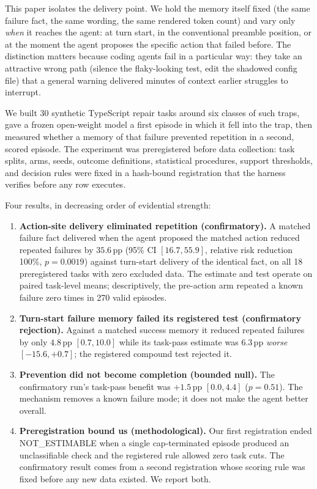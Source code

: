 \documentclass[11pt]{article}
\newcommand{\pp}{\ensuremath{\,\mathrm{pp}}}
\begin{document}
This paper isolates the delivery point. We hold the memory itself fixed (the
same failure fact, the same wording, the same rendered token count) and vary
only \emph{when} it reaches the agent: at turn start, in the conventional
preamble position, or at the moment the agent proposes the specific action
that failed before. The distinction matters because coding agents fail in a
particular way: they take an attractive wrong path (silence the flaky-looking
test, edit the shadowed config file) that a general warning delivered minutes
of context earlier struggles to interrupt.

We built 30 synthetic TypeScript repair tasks around six classes of such
traps, gave a frozen open-weight model a first episode in which it fell into
the trap, then measured whether a memory of that failure prevented repetition
in a second, scored episode. The experiment was preregistered before data
collection: task splits, arms, seeds, outcome definitions, statistical
procedures, support thresholds, and decision rules were fixed in a
hash-bound registration that the harness verifies before any row executes.

Four results, in decreasing order of evidential strength:

\begin{enumerate}
\item \textbf{Action-site delivery eliminated repetition (confirmatory).} A
  matched failure fact delivered when the agent proposed the matched action
  reduced repeated failures by $35.6\pp$ (95\% CI $[16.7, 55.9]$, relative
  risk reduction 100\%, $p = 0.0019$) against turn-start delivery of the
  identical fact, on all 18 preregistered tasks with zero excluded data. The
  estimate and test operate on paired task-level means; descriptively, the
  pre-action arm repeated a known failure zero times in 270 valid episodes.
\item \textbf{Turn-start failure memory failed its registered test
  (confirmatory rejection).} Against a matched success memory it reduced
  repeated failures by only $4.8\pp$ $[0.7, 10.0]$ while its task-pass
  estimate was $6.3\pp$ \emph{worse} $[-15.6, +0.7]$; the registered
  compound test rejected it.
\item \textbf{Prevention did not become completion (bounded null).} The
  confirmatory run's task-pass benefit was $+1.5\pp$ $[0.0, 4.4]$
  ($p = 0.51$). The mechanism removes a known failure mode; it does not make
  the agent better overall.
\item \textbf{Preregistration bound us (methodological).} Our first
  registration ended NOT\_ESTIMABLE when a single cap-terminated episode
  produced an unclassifiable check and the registered rule allowed zero task
  cuts. The confirmatory result comes from a second registration whose
  scoring rule was fixed before any new data existed. We report both.
\end{enumerate}
\end{document}
